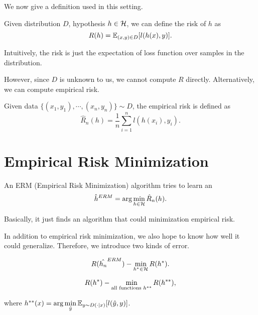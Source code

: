 \documentclass[../main.tex]{subfiles}
\begin{document}
	We now give a definition used in this setting.
	
	\begin{definition}
		Given distribution $D$, hypothesis $h \in \mathcal{H}$, we can define the risk of $h$ as
		\begin{equation}
		R(h) = \mathbb{E}_{(x,y) \in D} [l(h(x),y)].
		\end{equation}
	\end{definition}

	Intuitively, the risk is just the expectation of loss function over samples in the distribution.
	
	However, since $D$ is unknown to us, we cannot compute $R$ directly. Alternatively, we can compute empirical risk.
	
	\begin{definition}
		Given data $\{(x_1,y_1),\cdots , (x_n,y_n)\} \sim D$, the empirical risk is defined as
		\begin{equation}
			\hat{R}_n(h) = \frac{1}{n} \sum\limits_{i=1}^n l(h(x_i),y_i).
		\end{equation}
	\end{definition}

	\section{Empirical Risk Minimization}
	
	\begin{definition}
		An ERM (Empirical Risk Minimization) algorithm tries to learn an
		\begin{equation}
		\hat{h}^{ERM} = \arg\min\limits_{h\in \mathcal{H}} \hat{R}_n(h).
		\end{equation}
	\end{definition}

	Basically, it just finds an algorithm that could minimization empirical risk.
	
	In addition to empirical risk minimization, we also hope to know how well it could generalize. Therefore, we introduce two kinds of error.
	
	\begin{definition}
		\begin{equation}
			R(\hat{h_n}^{ERM}) - \min\limits_{h^* \in \mathcal{H}} R(h^*).
		\end{equation}
	\end{definition}

	\begin{definition}
		\begin{equation}
			R(h^*) - \min\limits_{\textmd{all functions } h^{**}} R(h^{**}),
		\end{equation}
		
		where $h^{**}(x) =\arg\min\limits_{\hat{y}} \mathbb{E}_{y\sim D(\cdot|x)} [l(\hat{y},y)]$.
	\end{definition}
\end{document}
